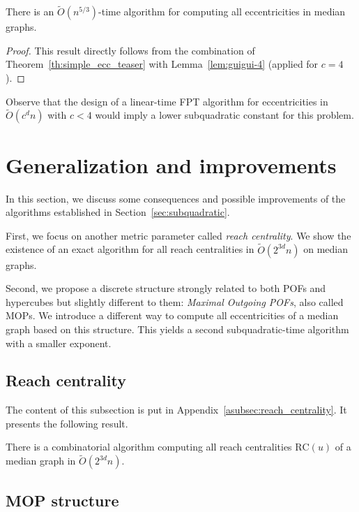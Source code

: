 \documentclass[a4paper,UKenglish,numberwithinsect,cleveref, autoref]{lipics-v2021}
\newcommand{\rc}{\mbox{RC}}
\begin{document}
\begin{theorem}\label{thm:guigui-5}
There is an $\tilde{O}(n^{5/3})$-time algorithm for computing all eccentricities in median graphs.
\end{theorem}
\begin{proof}
This result directly follows from the combination of Theorem~\ref{th:simple_ecc_teaser} with Lemma~\ref{lem:guigui-4} (applied for $c = 4$).
\end{proof}

Observe that the design of a linear-time FPT algorithm for eccentricities in $\tilde{O}(c^dn)$ with $c < 4$ would imply a lower subquadratic constant for this problem.

\section{Generalization and improvements} \label{sec:discussion}

In this section, we discuss some consequences and possible improvements of the algorithms established in Section~\ref{sec:subquadratic}. 

First, we focus on another metric parameter called \textit{reach centrality}. We show the existence of an exact algorithm for all reach centralities in $\tilde{O}(2^{3d}n)$ on median graphs.  

Second, we propose a discrete structure strongly related to both POFs and hypercubes but slightly different to them: \textit{Maximal Outgoing POFs}, also called MOPs. We introduce a different way to compute all eccentricities of a median graph based on this structure. This yields a second subquadratic-time algorithm with a smaller exponent.

\subsection{Reach centrality} \label{subsec:reach_centrality}

The content of this subsection is put in Appendix~\ref{asubsec:reach_centrality}. It presents the following result.

\begin{theorem}[\ref{th:simple_rc}]
There is a combinatorial algorithm computing all  reach centralities $\rc(u)$ of a median graph in $\tilde{O}(2^{3d}n)$.
\label{th:simple_rc_teaser}
\end{theorem}

\subsection{MOP structure} \label{subsec:mop}
\end{document}
